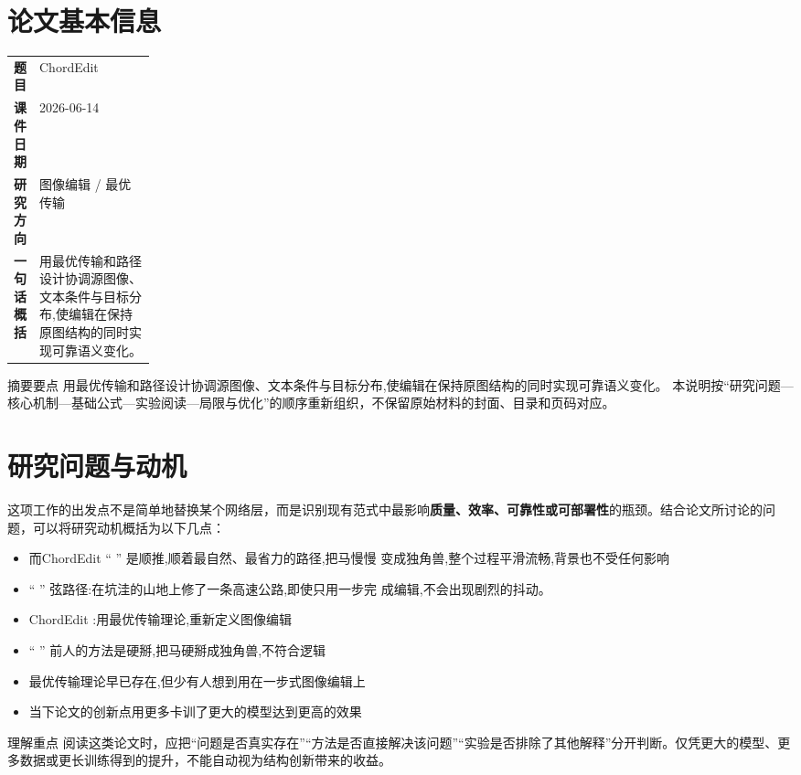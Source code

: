 \documentclass[UTF8,11pt,a4paper]{ctexart}
\newcommand{\term}[1]{\textbf{\textcolor{mainblue}{#1}}}
\begin{document}
\section{论文基本信息}
\begin{center}
\begin{tabularx}{0.94\linewidth}{>{\bfseries}p{0.18\linewidth}X}
\toprule
题目 & ChordEdit\\
课件日期 & 2026-06-14\\
研究方向 & 图像编辑 / 最优传输\\
一句话概括 & 用最优传输和路径设计协调源图像、文本条件与目标分布,使编辑在保持原图结构的同时实现可靠语义变化。\\
\bottomrule
\end{tabularx}
\end{center}

\begin{infobox}{摘要要点}
用最优传输和路径设计协调源图像、文本条件与目标分布,使编辑在保持原图结构的同时实现可靠语义变化。 本说明按“研究问题—核心机制—基础公式—实验阅读—局限与优化”的顺序重新组织，不保留原始材料的封面、目录和页码对应。
\end{infobox}

\section{研究问题与动机}
这项工作的出发点不是简单地替换某个网络层，而是识别现有范式中最影响\term{质量、效率、可靠性或可部署性}的瓶颈。结合论文所讨论的问题，可以将研究动机概括为以下几点：
\begin{itemize}
\item 而ChordEdit “ ” 是顺推,顺着最自然、最省力的路径,把马慢慢 变成独角兽,整个过程平滑流畅,背景也不受任何影响
\item “ ” 弦路径:在坑洼的山地上修了一条高速公路,即使只用一步完 成编辑,不会出现剧烈的抖动。
\item ChordEdit :用最优传输理论,重新定义图像编辑
\item “ ” 前人的方法是硬掰,把马硬掰成独角兽,不符合逻辑
\item 最优传输理论早已存在,但少有人想到用在一步式图像编辑上
\item 当下论文的创新点用更多卡训了更大的模型达到更高的效果
\end{itemize}

\begin{notebox}{理解重点}
阅读这类论文时，应把“问题是否真实存在”“方法是否直接解决该问题”“实验是否排除了其他解释”分开判断。仅凭更大的模型、更多数据或更长训练得到的提升，不能自动视为结构创新带来的收益。
\end{notebox}
\end{document}
